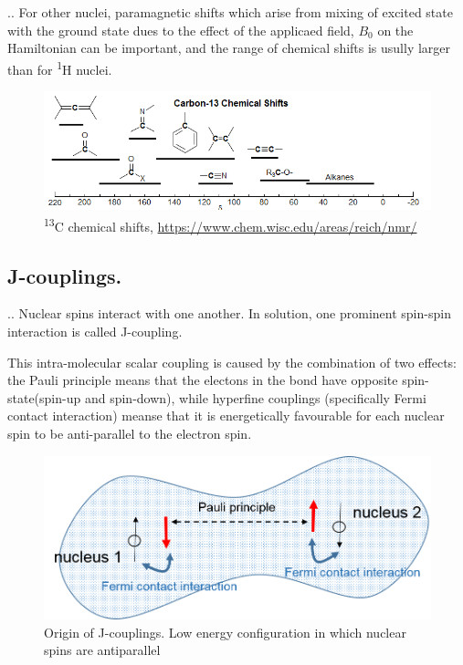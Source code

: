 \documentclass{beamer}
\begin{document}
\begin{frame}{\thesection.\thesubsection. \insertsubsection}
	For other nuclei, paramagnetic shifts which arise from mixing of excited state with the ground state dues to the effect of the applicaed field, $B_0$ on the Hamiltonian can be important, and the range of chemical shifts is usully larger than for \textsuperscript{1}H nuclei.
  \begin{figure}
  	\includegraphics[width=1.0\textwidth]{carbon_chemical_shifts.png}
  	\caption{\textsuperscript{13}C chemical shifts, \url{https://www.chem.wisc.edu/areas/reich/nmr/}}
  \end{figure}	
	
\end{frame}

\subsection{J-couplings.}
\begin{frame}{\thesection.\thesubsection. \insertsubsection}
	Nuclear spins interact with one another. In solution, one prominent spin-spin interaction is called \alert{J-coupling}.
	
	This intra-molecular scalar coupling is caused by the combination of two effects: the Pauli principle means that the electons in the bond have opposite spin-state(spin-up and spin-down), while hyperfine couplings (specifically Fermi contact interaction) meanse that it is energetically favourable for each nuclear spin to be anti-parallel to the electron spin. 
	
  \begin{figure}
  	\includegraphics[scale =0.5]{J-coupling.png}
  	\caption{Origin of J-couplings. Low energy configuration in which nuclear spins are antiparallel}
  \end{figure}	

\end{frame}
\end{document}
